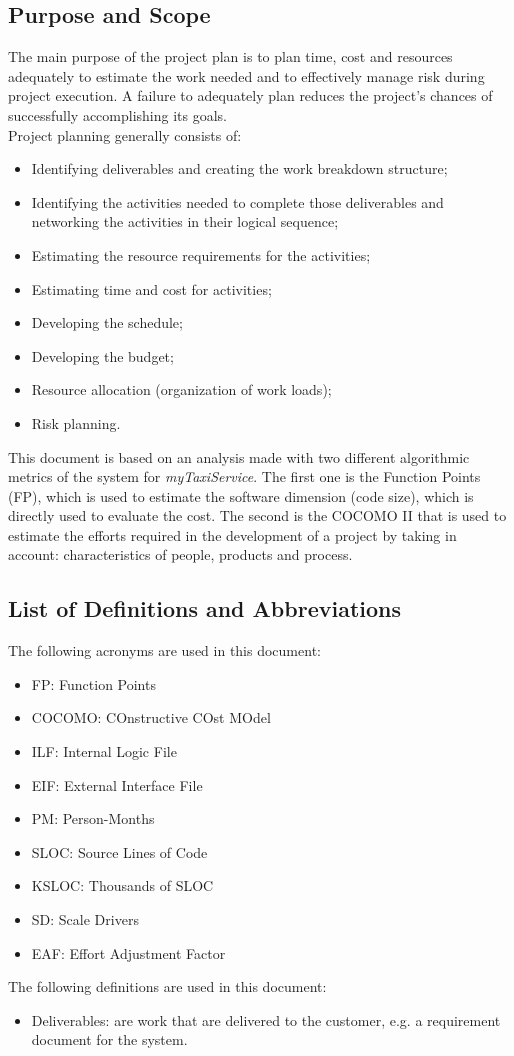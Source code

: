 \documentclass[a4paper,11pt]{report} %
\newcommand{\mts}{\mbox{\normalfont\itshape myTaxiService}}
\begin{document}
		\subsection{Purpose and Scope}
			The main purpose of the project plan is to plan time, cost and resources adequately to estimate the work needed and to effectively manage risk during project execution. A failure to adequately plan reduces the project's chances of successfully accomplishing its goals.\smallskip\\
			Project planning generally consists of:
			\begin{itemize}
				\item Identifying deliverables and creating the work breakdown structure;
				\item Identifying the activities needed to complete those deliverables and networking the activities in their logical sequence;
				\item Estimating the resource requirements for the activities;
				\item Estimating time and cost for activities;
				\item Developing the schedule;
				\item Developing the budget;
				\item Resource allocation (organization of work loads);
				\item Risk planning.
			\end{itemize} 
			This document is based on an analysis made with two different algorithmic metrics of the system for \mts{}. The first one is the Function Points (FP), which is used to estimate the software dimension (code size), which is directly used to evaluate the cost. The second is the COCOMO II that is used to estimate the efforts required in the development of a project by taking in account: characteristics of people, products and process. 
			
		\subsection{List of Definitions and Abbreviations}
			The following acronyms are used in this document:
			\begin{itemize}
				\item FP: Function Points
				\item COCOMO: COnstructive COst MOdel
				\item ILF: Internal Logic File
				\item EIF: External Interface File
				\item PM: Person-Months
				\item SLOC: Source Lines of Code
				\item KSLOC: Thousands of SLOC
				\item SD: Scale Drivers
				\item EAF: Effort Adjustment Factor
			\end{itemize}
			The following definitions are used in this document:
			\begin{itemize}
				\item Deliverables: are work that are delivered to the customer, e.g. a requirement document for the system.
			\end{itemize}
	
\end{document}
